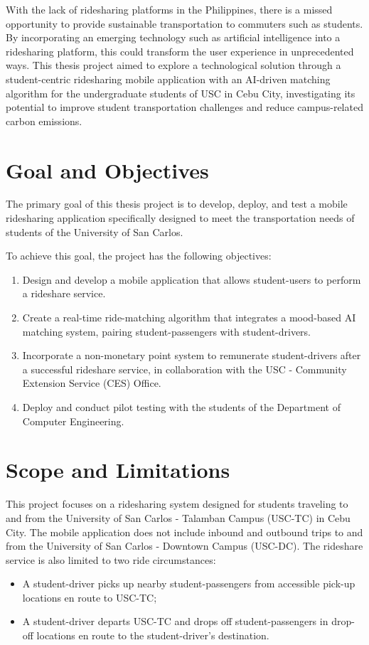 With the lack of ridesharing platforms in the Philippines, there is a missed opportunity to provide sustainable transportation to commuters such as students. By incorporating an emerging technology such as artificial intelligence into a ridesharing platform, this could transform the user experience in unprecedented ways. This thesis project aimed to explore a technological solution through a student-centric ridesharing mobile application with an AI-driven matching algorithm for the undergraduate students of USC in Cebu City, investigating its potential to improve student transportation challenges and reduce campus-related carbon emissions.


\section{Goal and Objectives}
The primary goal of this thesis project is to develop, deploy, and test a mobile ridesharing application specifically designed to meet the transportation needs of students of the University of San Carlos.

To achieve this goal, the project has the following objectives:
\begin{enumerate}
    \item Design and develop a mobile application that allows student-users to perform a rideshare service.
    \item Create a real-time ride-matching algorithm that integrates a mood-based AI matching system, pairing student-passengers with student-drivers.
    \item Incorporate a non-monetary point system to remunerate student-drivers after a successful rideshare service, in collaboration with the USC - Community Extension Service (CES) Office.
    \item Deploy and conduct pilot testing with the students of the Department of Computer Engineering.
\end{enumerate}

\section{Scope and Limitations}\label{sec:scope}
This project focuses on a ridesharing system designed for students traveling to and from the University of San Carlos - Talamban Campus (USC-TC) in Cebu City. The mobile application does not include inbound and outbound trips to and from the University of San Carlos - Downtown Campus (USC-DC). The rideshare service is also limited to two ride circumstances: 
\begin{itemize}
    \item A student-driver picks up nearby student-passengers from accessible pick-up locations en route to USC-TC; 
    \item  A student-driver departs USC-TC and drops off student-passengers in drop-off locations en route to the student-driver’s destination.
\end{itemize}

